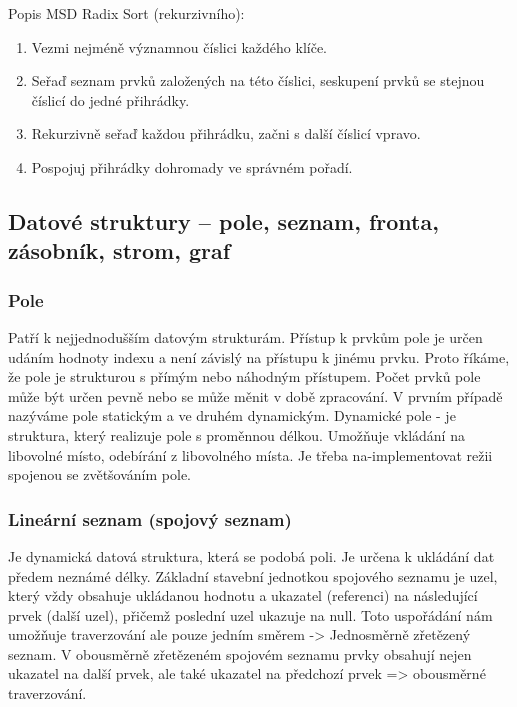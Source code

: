 Popis MSD Radix Sort (rekurzivního):
\begin{enumerate}
\item Vezmi nejméně významnou číslici každého klíče.
\item Seřaď seznam prvků založených na této číslici, seskupení prvků se stejnou číslicí do jedné přihrádky.
\item Rekurzivně seřaď každou přihrádku, začni s další číslicí vpravo.
\item Pospojuj přihrádky dohromady ve správném pořadí.
\end{enumerate}

\subsection[Datové struktury]{Datové struktury – pole, seznam, fronta, zásobník, strom, graf}

\subsubsection{Pole}
Patří k nejjednodušším datovým strukturám. Přístup k prvkům pole je určen udáním hodnoty indexu a není závislý na přístupu k jinému prvku. Proto říkáme, že pole je strukturou s přímým nebo náhodným přístupem. Počet prvků pole může být určen pevně nebo se může měnit v době zpracování. V prvním případě nazýváme pole statickým a ve druhém dynamickým.
Dynamické pole - je struktura, který realizuje pole s proměnnou délkou. Umožňuje vkládání na libovolné místo, odebírání z libovolného místa. Je třeba na-implementovat režii spojenou se zvětšováním pole.

\subsubsection{Lineární seznam (spojový seznam)}
Je dynamická datová struktura, která se podobá poli. Je určena k ukládání dat předem neznámé délky. Základní stavební jednotkou spojového seznamu je uzel, který vždy obsahuje ukládanou hodnotu a ukazatel (referenci) na následující prvek (další uzel), přičemž poslední uzel ukazuje na null. Toto uspořádání nám umožňuje traverzování ale pouze jedním směrem -> Jednosměrně zřetězený seznam. V obousměrně zřetězeném spojovém seznamu prvky obsahují nejen ukazatel na další prvek, ale také ukazatel na předchozí prvek => obousměrné traverzování. 

